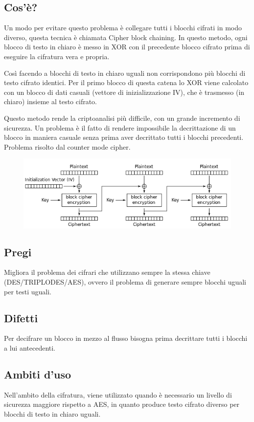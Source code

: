 \subsection{Cos'è?}
Un modo per evitare questo problema è collegare tutti i blocchi cifrati in modo diverso, questa tecnica è chiamata Cipher block chaining.
In questo metodo, ogni blocco di testo in chiaro è messo in XOR con il precedente blocco cifrato prima di eseguire la cifratura vera e propria.

Così facendo a blocchi di testo in chiaro uguali non corrispondono più blocchi di testo cifrato identici. Per il primo blocco di questa catena lo XOR viene calcolato con un blocco di dati casuali (vettore di inizializzazione IV), che è trasmesso (in chiaro) insieme al testo cifrato.

Questo metodo rende la criptoanalisi più difficile, con un grande incremento di sicurezza. Un problema è il fatto di rendere impossibile la decrittazione di un blocco in maniera casuale senza prima aver decrittato tutti i blocchi precedenti. Problema risolto dal counter mode cipher.

\begin{figure}[H]
\centering
\includegraphics[scale=0.7]{res/img/55_CBC.png}
\end{figure}

\subsection{Pregi}
Migliora il problema dei cifrari che utilizzano sempre la stessa chiave (DES/TRIPLODES/AES), ovvero il problema di generare sempre blocchi uguali per testi uguali. 
\subsection{Difetti}
Per decifrare un blocco in mezzo al flusso bisogna prima decrittare tutti i blocchi a lui antecedenti.
\subsection{Ambiti d'uso}
Nell'ambito della cifratura, viene utilizzato quando è necessario un livello di sicurezza maggiore rispetto a AES, in quanto produce testo cifrato diverso per blocchi di testo in chiaro uguali.

